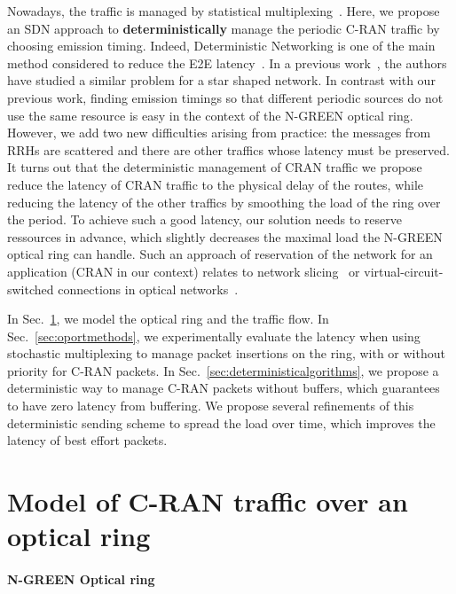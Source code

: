 \documentclass[10pt, conference, letterpaper]{IEEEtran}
\begin{document}
Nowadays, the traffic is managed by statistical multiplexing~\cite{kern2006applying}. Here, we propose an SDN approach to {\bf deterministically} manage the periodic C-RAN traffic by choosing emission timing. Indeed, Deterministic Networking is one of the main method considered to reduce the E2E latency~\cite{finn-detnet-architecture-08}. In a previous work~\cite{dominique2018deterministic}, the authors have studied a similar problem for a star shaped network. In contrast with our previous work, finding emission timings so that different periodic sources do not use the same resource is easy in the context of the N-GREEN optical ring. However, we add two new difficulties arising from practice: the messages from RRHs are scattered and there are other traffics whose latency must be preserved. It turns out that the deterministic management of CRAN traffic
we propose reduce the latency of CRAN traffic to the physical delay of the routes, while reducing the latency of the other traffics by smoothing the load of the ring over the period. To achieve such a good latency, our solution needs to reserve ressources in advance, which slightly decreases the maximal load the N-GREEN optical ring can handle. Such an approach of reservation of the network for an application (CRAN in our context) relates to network slicing~\cite{jiang2016network} or virtual-circuit-switched connections in optical networks~\cite{cadere2010virtual,szymanski2016ultra}.

In Sec.~\ref{sec:model}, we model the optical ring and the traffic flow. In Sec.~\ref{sec:oportmethods}, we experimentally evaluate the latency when using stochastic multiplexing to manage packet insertions on the ring, with or without priority for C-RAN packets. In Sec.~\ref{sec:deterministicalgorithms}, we propose a deterministic way to manage C-RAN packets without buffers, which guarantees to have zero latency from buffering. We propose several refinements of this deterministic sending scheme to spread the load over time, which improves the latency of best effort packets.

\section{Model of C-RAN traffic over an optical ring}
\label{sec:model}
    
  \paragraph{N-GREEN Optical ring}
   
\end{document}
